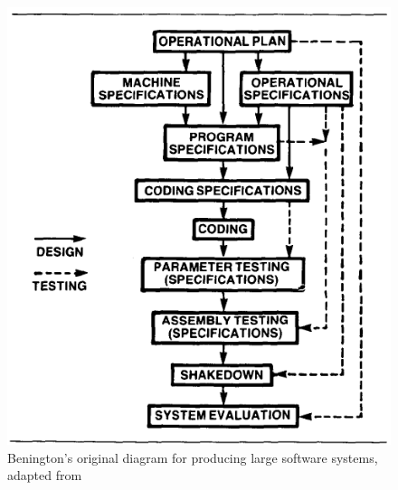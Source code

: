 \documentclass[SDSUThesis.tex]{subfiles}
\begin{document}
        \begin{figure}[ht]
            \centering
            \includegraphics[scale=.7]{images/benington_waterfall.PNG}
            \caption[BENINGTON'S ORIGINAL DIAGRAM FOR PRODUCING LARGE SOFTWARE SYSTEMS]
                    {Benington's original diagram for producing large software 
                        systems, adapted from \cite{Benington1987}}
            \label{fig:benington}
        \end{figure}%
\end{document}
